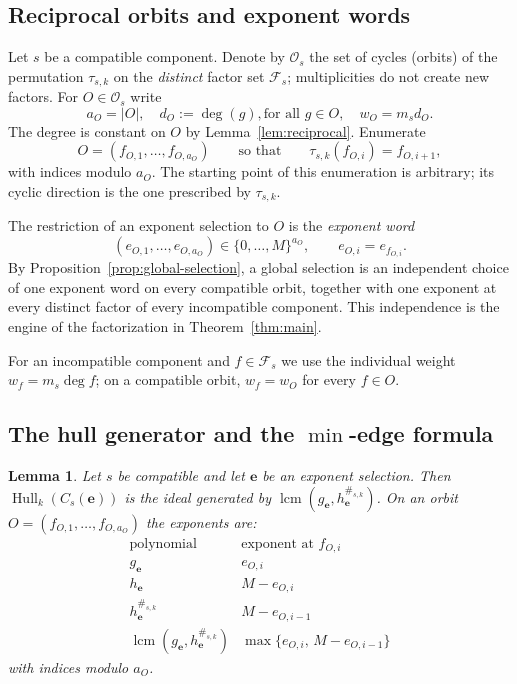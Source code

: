 \documentclass[preprint,12pt,a4paper]{elsarticle}
\newcommand{\Fs}{\mathcal F_s}
\newcommand{\Os}{\mathcal O_s}
\newcommand{\Hull}{\operatorname{Hull}}
\newcommand{\lcm}{\operatorname{lcm}}
\newtheorem{lemma}[theorem]{Lemma}
\theoremstyle{definition}
\theoremstyle{remark}
\begin{document}
\subsection{Reciprocal orbits and exponent words}\label{sec:orbits}

Let $s$ be a compatible component.  Denote by $\Os$ the set of cycles
(orbits) of the permutation $\tau_{s,k}$ on the \emph{distinct} factor set
$\Fs$; multiplicities do not create new factors.  For $O\in\Os$ write
\[
a_O=|O|,\quad d_O:=\deg(g),\text{for all }g\in O,\quad
w_O=m_sd_O .
\]
The degree is constant on $O$ by Lemma~\ref{lem:reciprocal}.  Enumerate
\[
O=(f_{O,1},\ldots,f_{O,a_O})
\qquad\text{so that}\qquad
\tau_{s,k}(f_{O,i})=f_{O,i+1},
\]
with indices modulo $a_O$.  The starting point of this enumeration is arbitrary;
its cyclic direction is the one prescribed by $\tau_{s,k}$.

The restriction of an exponent selection to $O$ is the \emph{exponent word}
\[
(e_{O,1},\ldots,e_{O,a_O})\in\{0,\ldots,M\}^{a_O},
\qquad e_{O,i}=e_{f_{O,i}} .
\]
By Proposition~\ref{prop:global-selection}, a global selection is an
independent choice of one exponent word on every compatible orbit, together
with one exponent at every distinct factor of every incompatible component.
This independence is the engine of the factorization in
Theorem~\ref{thm:main}.

For an incompatible component and $f\in\Fs$ we use the individual weight
$w_f=m_s\deg f$; on a compatible orbit, $w_f=w_O$ for every $f\in O$.

\subsection{The hull generator and the \texorpdfstring{$\min$}{min}-edge
formula}\label{sec:min-edge}

\begin{lemma}\label{lem:hull-generator}
Let $s$ be compatible and let $\mathbf{e}$ be an exponent selection.  Then
$\Hull_k(C_s(\mathbf{e}))$ is the ideal generated by
$\lcm(g_{\mathbf{e}},h_{\mathbf{e}}^{\#_{s,k}})$.  On an orbit
$O=(f_{O,1},\ldots,f_{O,a_O})$ the exponents are:
{\small
\[
\begin{array}{c|c}
\text{polynomial} & \text{exponent at }f_{O,i}\\ \hline
 g_{\mathbf{e}} & e_{O,i}\\
 h_{\mathbf{e}} & M-e_{O,i}\\
 h_{\mathbf{e}}^{\#_{s,k}} & M-e_{O,i-1}\\
 \lcm(g_{\mathbf{e}},h_{\mathbf{e}}^{\#_{s,k}}) &
   \max\{e_{O,i},\,M-e_{O,i-1}\}
\end{array}
\]
}
with indices modulo $a_O$.
\end{lemma}
\end{document}
